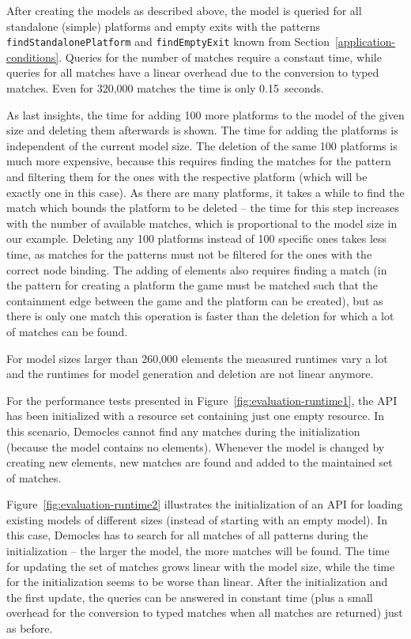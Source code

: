 \noindent
After creating the models as described above, the model is queried for all standalone (simple) platforms and empty exits with the patterns \texttt{findStandalonePlatform} and \texttt{findEmptyExit} known from Section~\ref{application-conditions}.
Queries for the number of matches require a constant time, while queries for all matches have a linear overhead due to the conversion to typed matches.
Even for 320,000 matches the time is only 0.15~seconds.

As last insights, the time for adding 100 more platforms to the model of the given size and deleting them afterwards is shown.
The time for adding the platforms is independent of the current model size.
The deletion of the same 100 platforms is much more expensive, because this requires finding the matches for the pattern and filtering them for the ones with the respective platform (which will be exactly one in this case).
As there are many platforms, it takes a while to find the match which bounds the platform to be deleted -- the time for this step increases with the number of available matches, which is proportional to the model size in our example.
Deleting any 100 platforms instead of 100 specific ones takes less time, as matches for the patterns must not be filtered for the ones with the correct node binding.
The adding of elements also requires finding a match (in the pattern for creating a platform the game must be matched such that the containment edge between the game and the platform can be created), but as there is only one match this operation is faster than the deletion for which a lot of matches can be found.

For model sizes larger than 260,000 elements the measured runtimes vary a lot and the runtimes for model generation and deletion are not linear anymore.

For the performance tests presented in Figure~\ref{fig:evaluation-runtime1}, the API has been initialized with a resource set containing just one empty resource.
In this scenario, Democles cannot find any matches during the initialization (because the model contains no elements).
Whenever the model is changed by creating new elements, new matches are found and added to the maintained set of matches.

Figure~\ref{fig:evaluation-runtime2} illustrates the initialization of an API for loading existing models of different sizes (instead of starting with an empty model).
In this case, Democles has to search for all matches of all patterns during the initialization -- the larger the model, the more matches will be found.
The time for updating the set of matches grows linear with the model size, while the time for the initialization seems to be worse than linear.
After the initialization and the first update, the queries can be answered in constant time (plus a small overhead for the conversion to typed matches when all matches are returned) just as before.

